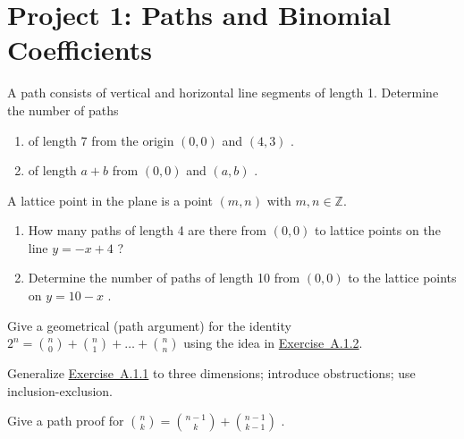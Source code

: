 \documentclass[10pt,]{book}
\theoremstyle{plain}
\theoremstyle{definition}
\theoremstyle{definition}
\theoremstyle{definition}
\theoremstyle{definition}
\numberwithin{equation}{chapter}
\def\Z{\mathbb Z}
\begin{document}
\section[{Project 1: Paths and Binomial Coefficients}]{Project 1: Paths and Binomial Coefficients}\label{exercises-11}
\begin{divisionexercise}{1}\hypertarget{ex-count-paths}{}
\hypertarget{p-1158}{}%
A path consists of vertical and horizontal line segments of length 1. Determine the number of paths \leavevmode%
\begin{enumerate}[label=(\alph*)]
\item\hypertarget{li-242}{}\hypertarget{p-1159}{}%
of length 7 from the origin \(\left( 0,0 \right)\) and \((4,3)\) .%
\item\hypertarget{li-243}{}\hypertarget{p-1160}{}%
of length \(a + b\) from \(\left( 0,0 \right)\) and \((a,b)\) .%
\end{enumerate}
%
\end{divisionexercise}%
\begin{divisionexercise}{2}\hypertarget{ex-paths-on-lines}{}
\hypertarget{p-1161}{}%
A lattice point in the plane is a point \((m,n)\) with \(m,n \in \Z\). \leavevmode%
\begin{enumerate}[label=(\alph*)]
\item\hypertarget{li-244}{}\hypertarget{p-1162}{}%
How many paths of length 4 are there from \((0,0)\) to lattice points on the line \(y = - x + 4\) ?%
\item\hypertarget{li-245}{}\hypertarget{p-1163}{}%
Determine the number of paths of length 10 from \((0,0)\) to the lattice points on \(y = 10 - x\) .%
\end{enumerate}
%
\end{divisionexercise}%
\begin{divisionexercise}{3}\hypertarget{exercise-124}{}
\hypertarget{p-1164}{}%
Give a geometrical (path argument) for the identity \(2^{n} =
\binom{n}{0}
+
\binom{n}{1}
+ \ldots +
\binom{n}{n}\) using the idea in \hyperlink{ex-paths-on-lines}{Exercise~A.1.2}.%
\end{divisionexercise}%
\begin{divisionexercise}{4}\hypertarget{exercise-125}{}
\hypertarget{p-1165}{}%
Generalize \hyperlink{ex-count-paths}{Exercise~A.1.1} to three dimensions; introduce obstructions; use inclusion-exclusion.%
\end{divisionexercise}%
\begin{divisionexercise}{5}\hypertarget{exercise-126}{}
\hypertarget{p-1166}{}%
Give a path proof for \(\binom{n}{k}
=
\binom{n - 1}{k}
+
\binom{n - 1}{k - 1}\) .%
\end{divisionexercise}%
\end{document}
